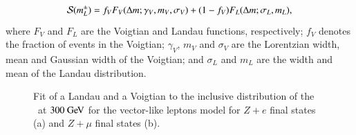 \begin{align}\label{eqn:resonance-signal-parametrization}
\mathcal{S}(m_\lpm) &= f_V F_V(\deltam; \gamma_V, m_V,  \sigma_V ) + (1-f_V)F_L(\deltam; \sigma_L, m_L), \\
\end{align}
where $F_V$ and $F_L$ are the Voigtian and Landau functions, respectively; $f_V$ denotes the fraction of events in the Voigtian; $\gamma_V$, $m_V$ and $\sigma_V$ are the Lorentzian width, mean and Gaussian width of the Voigtian; and $\sigma_L$ and $m_L$ are the width and mean of the Landau distribution.  

\begin{figure}[htb]
  \caption{Fit of a Landau and a Voigtian to the inclusive distribution of the \deltam\ at $300 \GeV$ for the vector-like leptons model for $Z+e$ final states (a) and $Z+\mu$ final states (b).}
  \label{fig:resonance-signal-fit-example}
\end{figure}

